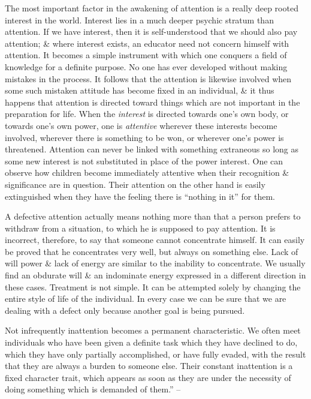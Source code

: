 \documentclass{article}
\begin{document}
The most important factor in the awakening of attention is a really deep rooted interest in the world. Interest lies in a much deeper psychic stratum than attention. If we have interest, then it is self-understood that we should also pay attention; \& where interest exists, an educator need not concern himself with attention. It becomes a simple instrument with which one conquers a field of knowledge for a definite purpose. No one has ever developed without making mistakes in the process. It follows that the attention is likewise involved when some such mistaken attitude has become fixed in an individual, \& it thus happens that attention is directed toward things which are not important in the preparation for life. When the {\it interest} is directed towards one's own body, or towards one's own power, one is {\it attentive} wherever these interests become involved, wherever there is something to be won, or wherever one's power is threatened. Attention can never be linked with something extraneous so long as some new interest is not substituted in place of the power interest. One can observe how children become immediately attentive when their recognition \& significance are in question. Their attention on the other hand is easily extinguished when they have the feeling there is ``nothing in it'' for them.

A defective attention actually means nothing more than that a person prefers to withdraw from a situation, to which he is supposed to pay attention. It is incorrect, therefore, to say that someone cannot concentrate himself. It can easily be proved that he concentrates very well, but always on something else. Lack of will power \& lack of energy are similar to the inability to concentrate. We usually find an obdurate will \& an indominate energy expressed in a different direction in these cases. Treatment is not simple. It can be attempted solely by changing the entire style of life of the individual. In every case we can be sure that we are dealing with a defect only because another goal is being pursued.

Not infrequently inattention becomes a permanent characteristic. We often meet individuals who have been given a definite task which they have declined to do, which they have only partially accomplished, or have fully evaded, with the result that they are always a burden to someone else. Their constant inattention is a fixed character trait, which appears as soon as they are under the necessity of doing something which is demanded of them.'' -- \cite[pp. 93--96]{Adler_human_nature}
\end{document}
